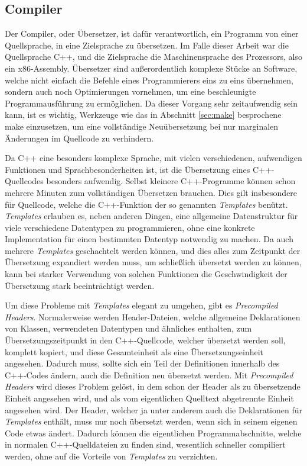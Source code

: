 \subsection{Compiler}
\label{sec:compiler}
Der Compiler, oder Übersetzer, ist dafür verantwortlich, ein Programm von einer Quellsprache, in eine Zielsprache zu übersetzen. Im Falle dieser Arbeit war die Quellsprache C++, und die
Zielsprache die Maschinensprache des Prozessors, also ein x86-Assembly. Übersetzer sind außerordentlich komplexe Stücke an Software, welche nicht einfach die Befehle eines Programmierers eins zu
eins übernehmen, sondern auch noch Optimierungen vornehmen, um eine beschleunigte Programmausführung zu ermöglichen. Da dieser Vorgang sehr zeitaufwendig sein kann, ist es wichtig, Werkzeuge wie
das in Abschnitt \ref{sec:make} besprochene make einzusetzen, um eine vollständige Neuübersetzung bei nur marginalen Änderungen im Quellcode zu verhindern. 

Da C++ eine besonders komplexe Sprache, mit vielen verschiedenen, aufwendigen Funktionen und Sprachbesonderheiten ist, ist die Übersetzung eines C++-Quellcodes besonders aufwendig. Selbst kleinere
C++-Programme können schon mehrere Minuten zum vollständigen Übersetzen brauchen. Dies gilt insbesondere für Quellcode, welche die C++-Funktion der so genannten \textit{Templates} benützt. \textit{Templates}
erlauben es, neben anderen Dingen, eine allgemeine Datenstruktur für viele verschiedene Datentypen zu programmieren, ohne eine konkrete Implementation für einen bestimmten Datentyp notwendig zu machen.
Da auch mehrere \textit{Templates} geschachtelt werden können, und dies alles zum Zeitpunkt der Übersetzung expandiert werden muss, um schließlich übersetzt werden zu können, kann bei starker Verwendung
von solchen Funktionen die Geschwindigkeit der Übersetzung stark beeinträchtigt werden.

Um diese Probleme mit \textit{Templates} elegant zu umgehen, gibt es \textit{Precompiled Headers}. Normalerweise werden Header-Dateien, welche allgemeine Deklarationen von Klassen, verwendeten Datentypen
und ähnliches enthalten, zum Übersetzungszeitpunkt in den C++-Quellcode, welcher übersetzt werden soll, komplett kopiert, und diese Gesamteinheit als eine Über\-setzungs\-einheit angesehen. Dadurch muss, sollte
sich ein Teil der Definitionen innerhalb des C++-Codes ändern, auch die Definition neu übersetzt werden. Mit \textit{Precompiled Headers} wird dieses Problem gelöst, in dem schon der Header als zu übersetzende
Einheit angesehen wird, und als vom eigentlichen Quelltext abgetrennte Einheit angesehen wird. Der Header, welcher ja unter anderem auch die Deklarationen für \textit{Templates} enthält, muss nur noch
übersetzt werden, wenn sich in seinem eigenen Code etwas ändert. Dadurch können die eigentlichen Programmabschnitte, welche in normalen C++-Quelldateien zu finden sind, wesentlich schneller
compiliert werden, ohne auf die Vorteile von \textit{Templates} zu verzichten.


